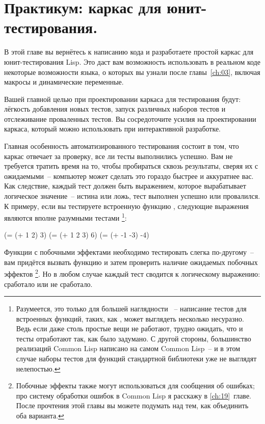 \chapter{Практикум: каркас для юнит-тестирования.}
\label{ch:09}

В этой главе вы вернётесь к написанию кода и разработаете простой каркас для
юнит-тестирования Lisp. Это даст вам возможность использовать в реальном коде некоторые
возможности языка, о которых вы узнали после главы~\ref{ch:03}, включая макросы и динамические
переменные.

Вашей главной целью при проектировании каркаса для тестирования будут: лёгкость добавления
новых тестов, запуск различных наборов тестов и отслеживание проваленных тестов. Вы
сосредоточите усилия на проектировании каркаса, который можно использовать при
интерактивной разработке.

Главная особенность автоматизированного тестирования состоит в том, что каркас отвечает за
проверку, все ли тесты выполнились успешно. Вам не требуется тратить время на то, чтобы
пробираться сквозь результаты, сверяя их с ожидаемыми~-- компьютер может сделать это
гораздо быстрее и аккуратнее вас. Как следствие, каждый тест должен быть выражением,
которое вырабатывает логическое значение~-- истина или ложь, тест выполнен успешно или
провалился. К примеру, если вы тестируете встроенную функцию \code{+}, следующие выражения
являются вполне разумными тестами \footnote{Разумеется, это только для большей наглядности
 ~-- написание тестов для встроенных функций, таких, как \code{+}, может выглядеть
  несколько несуразно. Ведь если даже столь простые вещи не работают, трудно ожидать, что
  и тесты отработают так, как было задумано. С другой стороны, большинство реализаций
  Common Lisp написано на самом Common Lisp~-- и в этом случае наборы тестов для функций
  стандартной библиотеки уже не выглядят нелепостью.}:

\begin{myverb}
(= (+ 1 2) 3)
(= (+ 1 2 3) 6)
(= (+ -1 -3) -4)
\end{myverb}

Функции с побочными эффектами необходимо тестировать слегка по-другому~-- вам придётся
вызвать функцию и затем проверить наличие ожидаемых побочных эффектов \footnote{Побочные
  эффекты также могут использоваться для сообщения об ошибках; про систему обработки
  ошибок в Common Lisp я расскажу в \ref{ch:19}~главе.  После прочтения этой главы вы можете
  подумать над тем, как объединить оба варианта.}. Но в любом случае каждый тест сводится
к логическому выражению: сработало или не сработало.


